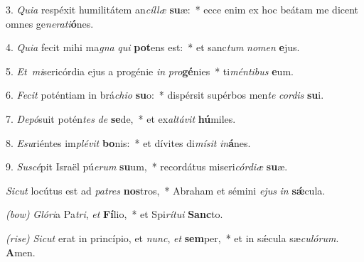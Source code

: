 3. \textit{Quia} respéxit humilitátem an\textit{cíl}\textit{læ} \textbf{su}æ:~* ecce enim ex hoc beátam me dicent omnes ge\textit{ne}\textit{ra}\textit{ti}\textbf{ó}nes.

4. \textit{Quia} fecit mihi ma\textit{gna} \textit{qui} \textbf{pot}ens est:~* et sanc\textit{tum} \textit{no}\textit{men} \textbf{e}jus.

5. \textit{Et\ mi}sericórdia ejus a progénie \textit{in} \textit{pro}\textbf{gé}nies~* ti\textit{mén}\textit{ti}\textit{bus} \textbf{e}um.

6. \textit{Fecit} poténtiam in brá\textit{chi}\textit{o} \textbf{su}o:~* dispérsit supérbos men\textit{te} \textit{cor}\textit{dis} \textbf{su}i.

7. \textit{Depó}suit potén\textit{tes} \textit{de} \textbf{se}de,~* et ex\textit{al}\textit{tá}\textit{vit} \textbf{hú}miles.

8. \textit{Esu}riéntes im\textit{plé}\textit{vit} \textbf{bo}nis:~* et dívites di\textit{mí}\textit{sit} \textit{in}\textbf{á}nes.

9. \textit{Suscé}pit Israël pú\textit{e}\textit{rum} \textbf{su}um,~* recordátus miseri\textit{cór}\textit{di}\textit{æ} \textbf{su}æ.

\textit{Sicut} locútus est ad \textit{pa}\textit{tres} \textbf{nos}tros,~* Abraham et sémini \textit{e}\textit{jus} \textit{in} \textbf{s\'{\ae}}cula.

{\color{red}\textit{(bow)}} \textit{Glóri}a Pa\textit{tri}, \textit{et} \textbf{Fí}lio,~* et Spi\textit{rí}\textit{tu}\textit{i} \textbf{Sanc}to.

{\color{red}\textit{(rise)}} \textit{Sicut} erat in princípio, et \textit{nunc}, \textit{et} \textbf{sem}per,~* et in s\'{\ae}cula sæ\textit{cu}\textit{ló}\textit{rum}. \textbf{A}men.